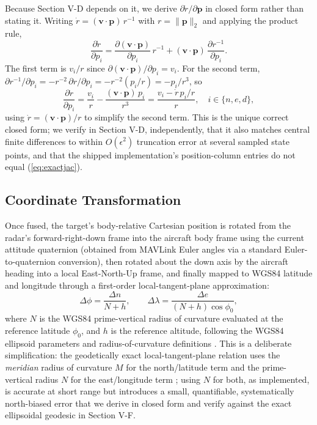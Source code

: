 \documentclass[conference]{IEEEtran}
\begin{document}
Because Section V-D depends on it, we derive $\partial \dot r/\partial \mathbf{p}$ in closed form rather than stating it. Writing $\dot r = (\mathbf{v}\cdot\mathbf{p})\,r^{-1}$ with $r = \|\mathbf{p}\|_2$ and applying the product rule,
\begin{equation}
\frac{\partial \dot r}{\partial p_i} = \frac{\partial(\mathbf{v}\cdot\mathbf{p})}{\partial p_i}\, r^{-1} + (\mathbf{v}\cdot\mathbf{p})\,\frac{\partial r^{-1}}{\partial p_i}.
\label{eq:productrule}
\end{equation}
The first term is $v_i / r$ since $\partial(\mathbf{v}\cdot\mathbf{p})/\partial p_i = v_i$. For the second term, $\partial r^{-1}/\partial p_i = -r^{-2}\,\partial r/\partial p_i = -r^{-2}(p_i/r) = -p_i/r^3$, so
\begin{equation}
\frac{\partial \dot r}{\partial p_i} = \frac{v_i}{r} - \frac{(\mathbf{v}\cdot\mathbf{p})\,p_i}{r^3} = \frac{v_i - \dot r\, p_i / r}{r}, \quad i \in \{n,e,d\},
\label{eq:exactjac}
\end{equation}
using $\dot r = (\mathbf{v}\cdot\mathbf{p})/r$ to simplify the second term. This is the unique correct closed form; we verify in Section V-D, independently, that it also matches central finite differences to within $O(\epsilon^2)$ truncation error at several sampled state points, and that the shipped implementation's position-column entries do not equal (\ref{eq:exactjac}).

\subsection{Coordinate Transformation}

Once fused, the target's body-relative Cartesian position is rotated from the radar's forward-right-down frame into the aircraft body frame using the current attitude quaternion (obtained from MAVLink Euler angles via a standard Euler-to-quaternion conversion), then rotated about the down axis by the aircraft heading into a local East-North-Up frame, and finally mapped to WGS84 latitude and longitude through a first-order local-tangent-plane approximation:
\begin{equation}
\Delta\phi = \frac{\Delta n}{N + h}, \qquad
\Delta\lambda = \frac{\Delta e}{(N+h)\cos\phi_0},
\label{eq:llh}
\end{equation}
where $N$ is the WGS84 prime-vertical radius of curvature evaluated at the reference latitude $\phi_0$, and $h$ is the reference altitude, following the WGS84 ellipsoid parameters and radius-of-curvature definitions \cite{r8}. This is a deliberate simplification: the geodetically exact local-tangent-plane relation uses the \emph{meridian} radius of curvature $M$ for the north/latitude term and the prime-vertical radius $N$ for the east/longitude term \cite{r8}; using $N$ for both, as implemented, is accurate at short range but introduces a small, quantifiable, systematically north-biased error that we derive in closed form and verify against the exact ellipsoidal geodesic \cite{r7} in Section V-F.
\end{document}
